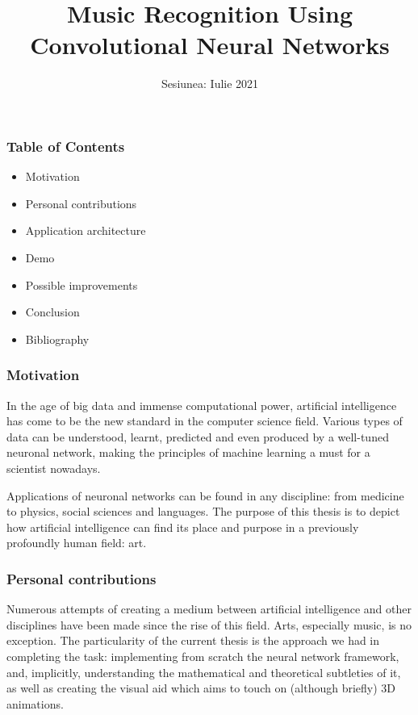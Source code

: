\documentclass{beamer}
\institute{UNIVERSITATEA ”ALEXANDRU-IOAN CUZA” DIN IAȘI}
\title{Music Recognition Using Convolutional Neural Networks}
\author{{Absolvent: Vavilov Andrei} \\
{\and} \\
{Coordonator științific: Conf. Dr. Vitcu Anca} }
\date{Sesiunea: Iulie 2021}
\begin{document}
\frame{\titlepage}

\begin{frame}
\frametitle{Table of Contents}

\begin{itemize}
	\item Motivation
	\item Personal contributions
	\item Application architecture
	\item Demo
	\item Possible improvements
	\item Conclusion
	\item Bibliography
\end{itemize}
\end{frame}

\begin{frame}
\frametitle{Motivation}
In the age of big data and immense computational power, artificial intelligence
has come to be the new standard in the computer science field. Various types of data
can be understood, learnt, predicted and even produced by a well-tuned neuronal network,
making the principles of machine learning a must for a scientist nowadays.


Applications of neuronal networks can be found in any discipline: from medicine
to physics, social sciences and languages. The purpose of this thesis is to depict how
artificial intelligence can find its place and purpose in a previously profoundly human
field: art.
\end{frame}

\begin{frame}
\frametitle{Personal contributions}
Numerous attempts of creating a medium between artificial intelligence and other
disciplines have been made since the rise of this field. Arts, especially music, is no exception.
The particularity of the current thesis is the approach we had in completing the
task: implementing from scratch the neural network framework, and, implicitly, understanding
the mathematical and theoretical subtleties of it, as well as creating the
visual aid which aims to touch on (although briefly) 3D animations.
\end{frame}
\end{document}
